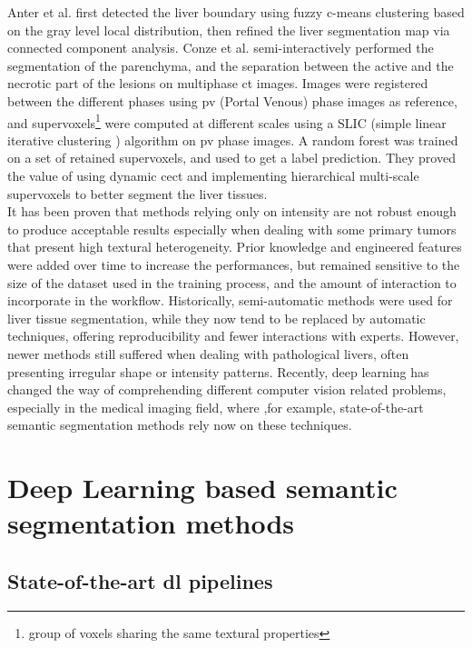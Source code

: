 Anter et al. \cite{Anter2014} first detected the liver boundary using fuzzy c-means
clustering based on the gray level local distribution, then refined the
liver segmentation map via connected component analysis. Conze et al. \cite{Conze2017} semi-interactively performed 
the segmentation of the parenchyma, and the separation between 
the active and the necrotic part of the lesions on multiphase \ac{ct} images.
Images were registered between the different phases using \ac{pv} (Portal Venous) phase images as reference, and
supervoxels\footnote{group of voxels sharing the same textural properties}
were computed at different scales using a SLIC (simple linear iterative clustering ) 
algorithm on \ac{pv} phase images. A random forest was trained 
on a set of retained supervoxels, and used to get a label prediction. 
They proved the value of using dynamic \ac{cect} and implementing 
hierarchical multi-scale supervoxels to better segment the liver tissues.\\
It has been proven that methods relying only on intensity are not robust
enough to produce acceptable results especially when dealing with some
primary tumors that present high textural heterogeneity. Prior knowledge
and engineered features were added over time to increase the
performances, but remained sensitive to the size of the dataset used in
the training process, and the amount of interaction to incorporate in
the workflow.
Historically, semi-automatic methods were used for liver tissue
segmentation, while they now tend to be replaced by automatic
techniques, offering reproducibility and fewer interactions with
experts. However, newer methods still suffered when dealing with
pathological livers, often presenting irregular shape or intensity
patterns.
Recently, deep learning has changed the way of comprehending different
computer vision related problems, especially in the medical imaging
field, where ,for example, state-of-the-art semantic segmentation 
methods rely now on these techniques.


\section{Deep Learning based semantic segmentation methods}

\subsection{State-of-the-art \ac{dl} pipelines} \label{subsection:StateOfTheArtDlImplementations}

